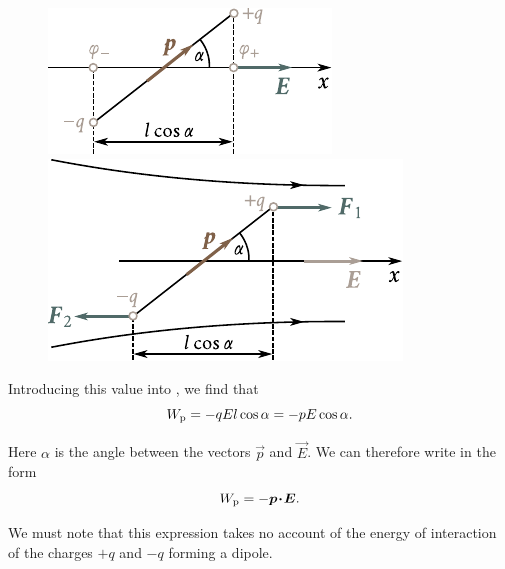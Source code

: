 \begin{figure}[t]
	\begin{minipage}[t]{0.5\linewidth}
		\begin{center}
			\includegraphics[scale=1]{figures/ch_01/fig_1_13.pdf}
			\caption[]{}
			\label{fig:1_13}
		\end{center}
	\end{minipage}
	\hspace{-0.05cm}
	\begin{minipage}[t]{0.5\linewidth}
		\begin{center}
			\includegraphics[scale=1]{figures/ch_01/fig_1_14.pdf}
			\caption[]{}
			\label{fig:1_14}
		\end{center}
	\end{minipage}
\vspace{-0.4cm}
\end{figure}

\noindent
Introducing this value into , we find that
\begin{equation}\label{eq:1_60}
	W_{\text{p}} = - q E l \cos\alpha = - p E \cos\alpha.
\end{equation}

\noindent
Here $\alpha$ is the angle between the vectors $\vec{p}$ and $\vec{E}$. We can therefore write  in the form
\begin{equation}\label{eq:1_61}
	W_{\text{p}} = - \boldsymbol{p\!\cdot\!E}.
\end{equation}

\noindent
We must note that this expression takes no account of the energy of interaction of the charges $+q$ and $-q$ forming a dipole.

